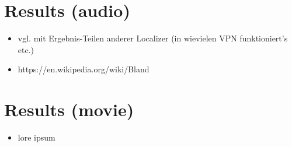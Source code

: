 \documentclass[english]{article}
\begin{document}
\section{Results (audio)}
\begin{itemize}
\item vgl. mit Ergebnis-Teilen anderer Localizer (in wievielen VPN funktioniert's etc.)
\item   https://en.wikipedia.org/wiki/Bland%
\end{itemize}

\section{Results (movie)}
\begin{itemize}
\item lore ipsum
\end{itemize}

\end{document}

